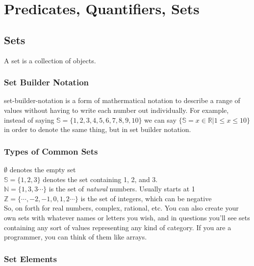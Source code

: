 \section{Predicates, Quantifiers, Sets}
\subsection{Sets}

A \gls{set} is a collection of objects. 
\subsubsection{Set Builder Notation}
\gls{set-builder-notation} is a form of mathermatical notation to describe a
range of values without having to write each number out individually. For
example, instead of saying $\mathbb{S} = \{1, 2, 3, 4, 5, 6, 7, 8, 9, 10 \}$ we
can say $\{\mathbb{S} = { x \in \mathbb{R} | 1 \leq x \leq 10}\}$ in order to
denote the same thing, but in set builder notation.

\subsubsection{Types of Common Sets}
$ \emptyset $ denotes the empty set\\
$ \mathbb{S} = \{1, 2, 3\}$ denotes the set containing 1, 2, and 3. \\  
$ \mathbb{N} = \{ 1,3,3\cdots\}$  is the set of \textit{natural} numbers.
Usually starts at 1 \\
$ \mathbb{Z} = \{\cdots, -2, -1, 0, 1, 2 \cdots\} $ is the set of integers,
which can be negative \\
\newline So, on forth  for real numbers, complex, rational, etc. You can also
create your own sets with whatever names or letters you wish, and in questions
you'll see sets containing any sort of values representing any kind of
category. If you are a programmer, you can think of them like arrays.

\subsubsection{Set Elements}

